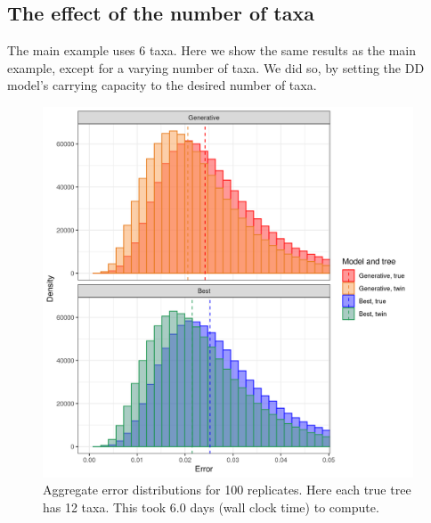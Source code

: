 \newpage

\subsection{The effect of the number of taxa}
\label{subsec:n_taxa}

The main example uses 6 taxa. Here we show the same results as the main example,
except for a varying number of taxa. We did so, by setting the DD model's
carrying capacity to the desired number of taxa.

\begin{figure}[H]
  \includegraphics[width=0.98\textwidth]{pirouette_example_32/errors.png}
  \caption{Aggregate error distributions for 100 replicates. Here each true tree has 12 taxa. This took 6.0 days (wall clock time) to compute.}
  \label{fig:example_12_taxa}
\end{figure}

